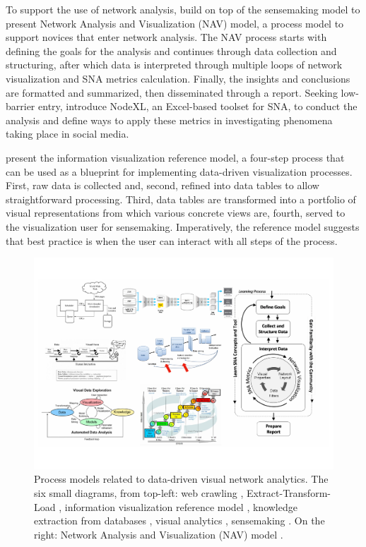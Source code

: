 To support the use of network analysis, \cite{Hansen2012DoData} build on top of the sensemaking model \citep{Pirolli2005TheAnalysis} to present Network Analysis and Visualization (NAV) model, a process model to support novices that enter network analysis. The NAV process starts with defining the goals for the analysis and continues through data collection and structuring, after which data is interpreted through multiple loops of network visualization and SNA metrics calculation. Finally, the insights and conclusions are formatted and summarized, then disseminated through a report. Seeking low-barrier entry, \cite{Hansen2011AnalyzingWorld} introduce NodeXL, an Excel-based toolset for SNA, to conduct the analysis and define ways to apply these metrics in investigating phenomena taking place in social media.

\cite{Card1999ReadingsThink} present the information visualization reference model, a four-step process that can be used as a blueprint for implementing data-driven visualization processes. First, raw data is collected and, second, refined into data tables to allow straightforward processing. Third, data tables are transformed into a portfolio of visual representations from which various concrete views are, fourth, served to the visualization user for sensemaking. Imperatively, the reference model suggests that best practice is when the user can interact with all steps of the process.

\begin{figure}[htb]
\centering
\includegraphics[width=14cm]{figure/Process-models-collage.pdf}
\caption{Process models related to data-driven visual network analytics. The six small diagrams, from top-left: 
web crawling \citep{Wikipedia.org2015}, 
Extract-Transform-Load \citep{Intel2013}, 
information visualization reference model \citep{Card1999ReadingsThink}, 
knowledge extraction from databases \citep{Indarto2013}, 
visual analytics \citep{Keim2010MasteringAnalytics}, 
sensemaking \citep{Pirolli2005TheAnalysis}. 
On the right: Network Analysis and Visualization (NAV) model \citep{Hansen2012DoData}.}
\label{fig:process-model-collage}
\end{figure}

